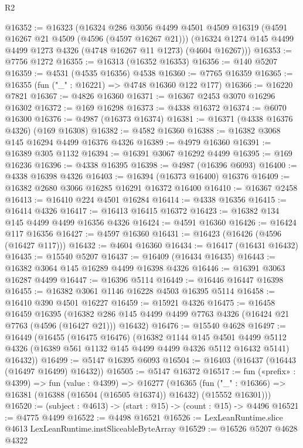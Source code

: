 \begin{lexlean}{R2}
\begin{coremodule}
@16352 := @16323
    (@16324
      @286
      @3056
      @4499
      @4501
      @4509
      @16319
      (@4591 @16267 @21 @4509 (@4596 (@4597 @16267 @21)))
      (@16324 @1274 @145 @4499 @4499 @1273 @4326 (@4748 @16267 @11 @1273) (@4604 @16267)))
@16353 := @7756 @1272
@16355 := @16313 (@16352 @16353)
@16356 := @140 @5207
@16359 := @4531 (@4535 @16356) @4538
@16360 := @7765 @16359
@16365 := @16355 (fun ("_" : @16221) => @4748 @16360 @122 @177)
@16366 := @16220 @7821
@16367 := @4826 @16360
@16371 := @16367 @2453 @3070 @16296 @16302
@16372 := @169 @16298
@16373 := @4338 @16372
@16374 := @6070 @16300
@16376 := @4987 (@16373 @16374)
@16381 := @16371 (@4338 @16376 @4326) (@169 @16308)
@16382 := @4582 @16360
@16388 := @16382 @3068 @145 @16294 @4499 @16376 @4326
@16389 := @4979 @16360
@16391 := @16389 @305 @1132
@16394 := @16391 @3067 @16292 @4499
@16395 := @169 @16236
@16396 := @4338 @16395
@16398 := @4987 (@16396 @6093)
@16400 := @4338 @16398 @4326
@16403 := @16394 (@16373 @16400) @16376
@16409 := @16382 @2680 @3066 @16285 @16291 @16372 @16400
@16410 := @16367 @2458
@16413 := @16410 @224 @4501 @16284
@16414 := @4338 @16356
@16415 := @16414 @4326
@16417 := @16413 @16415 @16372
@16423 := @16382 @134 @145 @4499 @4499 @16356 @4326
@16424 := @4591 @16360
@16426 := @16424 @117 @16356
@16427 := @4597 @16360
@16431 := @16423 (@16426 (@4596 (@16427 @117)))
@16432 := @4604 @16360
@16434 := @16417 (@16431 @16432)
@16435 := @15540 @5207
@16437 := @16409 (@16434 @16435)
@16443 := @16382 @3064 @145 @16289 @4499 @16398 @4326
@16446 := @16391 @3063 @16287 @4499
@16447 := @16396 @5114
@16449 := @16446 @16447 @16398
@16455 := @16382 @3061 @1146 @16228 @4503 @16395 @5114
@16458 := @16410 @390 @4501 @16227
@16459 := @15921 @4326
@16475 := @16458
    @16459
    @16395
    (@16382 @286 @145 @4499 @4499 @7763 @4326 (@16424 @21 @7763 (@4596 (@16427 @21))) @16432)
@16476 := @15540 @4628
@16497 := @16449
    (@16455
      (@16475 @16476)
      (@16382
        @1144
        @145
        @4501
        @4499
        @5112
        @4326
        (@16389 @561 @1132 @145 @4499 @4499 @4326 @5112 @16432 @5141)
        @16432))
@16499 := @5147 @16395 @6093
@16504 := @16403 (@16437 (@16443 (@16497 @16499) @16432))
@16505 := @5147 @16372
@16517 := fun («prefix» : @4399) =>
  fun (value : @4399) =>
  @16277
    (@16365 (fun ("_" : @16366) => @16381 (@16388 (@16504 (@16505 @16374)) @16432) (@15552 @16301)))
@16520 := (subject : @4613) -> (start : @15) -> (count : @15) -> @4496
@16521 := @4775 @4499
@16522 := @4498 @16521
@16526 := LexLeanRuntime.slice @4613 LexLeanRuntime.instSliceableByteArray
@16529 := @16526 @5207 @4628 @4322

\end{coremodule}
\end{lexlean}
